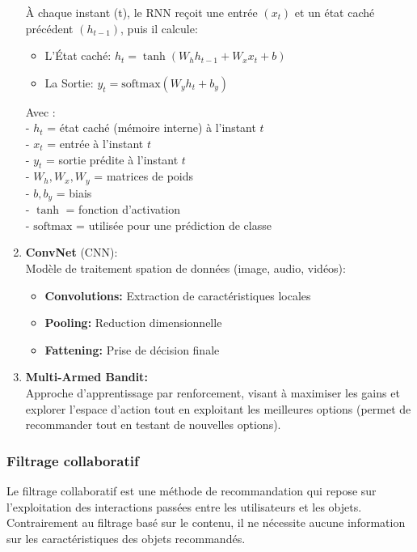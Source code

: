 \documentclass{article}
\begin{document}
\begin{enumerate}
        À chaque instant (t), le RNN reçoit une entrée \((x_t)\) et un état caché précédent \((h_{t-1})\), puis il calcule:
        \begin{itemize}
            \item L'État caché: \(h_t = \tanh(W_h h_{t-1} + W_x x_t + b)\)
            \item  La Sortie: \(y_t = \text{softmax}(W_y h_t + b_y)\)
        \end{itemize}
        Avec :\\
        - \( h_t \) = état caché (mémoire interne) à l’instant \( t \)\\
        - \( x_t \) = entrée à l’instant \( t \)\\
        - \( y_t \) = sortie prédite à l’instant \( t \)\\
        - \( W_h, W_x, W_y \) = matrices de poids\\
        - \( b, b_y \) = biais\\
        - \( \tanh \) = fonction d’activation\\
        - \( \text{softmax} \) = utilisée pour une prédiction de classe\\

        \item \textbf{ConvNet} (CNN):\\
        Modèle de traitement spation de données (image, audio, vidéos):
        \begin{itemize}
            \item \textbf{Convolutions:} Extraction de caractéristiques locales
            \item \textbf{Pooling:} Reduction dimensionnelle
            \item \textbf{Fattening:} Prise de décision finale
        \end{itemize}

        \item \textbf{Multi-Armed Bandit: }\\
        Approche d'apprentissage par renforcement, visant à maximiser les gains et explorer l'espace d'action tout en exploitant les meilleures options (permet de recommander tout en testant de nouvelles options).


    \end{enumerate}

    \subsubsection{Filtrage collaboratif}
    Le filtrage collaboratif est une méthode de recommandation qui repose sur l’exploitation des interactions passées entre les utilisateurs
    et les objets.
    Contrairement au filtrage basé sur le contenu, il ne nécessite aucune information sur les caractéristiques des objets recommandés.
\end{document}
